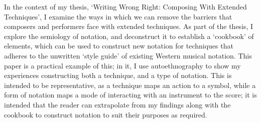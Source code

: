 In the context of my thesis, `Writing Wrong Right: Composing With Extended Techniques', I examine the ways in which we can remove the barriers that composers and performers face with extended techniques.
As part of the thesis, I explore the semiology of notation, and deconstruct it to establish a `cookbook' of elements, which can be used to construct new notation for techniques that adheres to the unwritten `style guide' of existing Western musical notation.
This paper is a practical example of this; in it, I use autoethnography to show my experiences constructing both a technique, and a type of notation. 
This is intended to be representative, as a technique maps an action to a symbol, while a form of notation maps a mode of interacting with an instrument to the score;
it is intended that the reader can extrapolate from my findings along with the cookbook to construct notation to suit their purposes as required.
